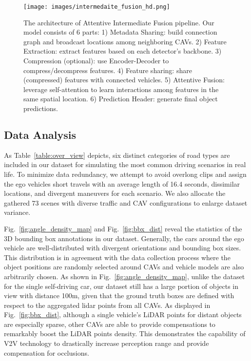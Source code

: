 \documentclass[letterpaper, 10 pt, conference]{ieeeconf}
\begin{document}
\begin{figure*}[!t]
\centering
\texttt{[image: images/intermedaite\_fusion\_hd.png]}
\caption{The architecture of Attentive Intermediate Fusion pipeline. Our model consists of 6 parts: 1) Metadata Sharing: build connection graph and broadcast locations among neighboring CAVs. 2) Feature Extraction: extract features based on each detector's backbone. 3) Compression (optional): use Encoder-Decoder to compress/decompress features. 4) Feature sharing: share (compressed) features with connected vehicles. 5) Attentive Fusion: leverage self-attention to learn interactions among features in the same spatial location. 6) Prediction Header: generate final object predictions.}
\label{fig:intermediate}
\end{figure*} 

\subsection{Data Analysis}
As Table~\ref{table:over_view} depicts, six distinct categories of road types are included in our dataset for simulating the most common driving scenarios in real life. To minimize data redundancy, we attempt to avoid overlong clips and assign the ego vehicles short travels with an average length of 16.4 seconds,  dissimilar locations,  and divergent maneuvers for each scenario. We also allocate the gathered 73 scenes with diverse traffic and CAV configurations to enlarge dataset variance.  


Fig.~\ref{fig:angle_density_map} and Fig.~\ref{fig:bbx_dist} reveal the statistics of the 3D bounding box annotations in our dataset.  Generally, the cars around the ego vehicle are well-distributed with divergent orientations and bounding box sizes. This distribution is in agreement with the data collection process where the object positions are randomly selected around CAVs and vehicle models are also arbitrarily chosen. As shown in Fig.~\ref{fig:angle_density_map}, unlike the dataset for the single self-driving car, our dataset still has a large portion of objects in view with distance  100m, given that the ground truth boxes are defined with respect to the aggregated lidar points from all CAVs. As displayed in Fig.~\ref{fig:bbx_dist}, although a single vehicle's LiDAR points for distant objects are especially sparse, other CAVs are able to provide compensations to remarkably boost the LiDAR points density. This demonstrates the capability of V2V technology to drastically increase perception range and provide compensation for occlusions.
\end{document}
